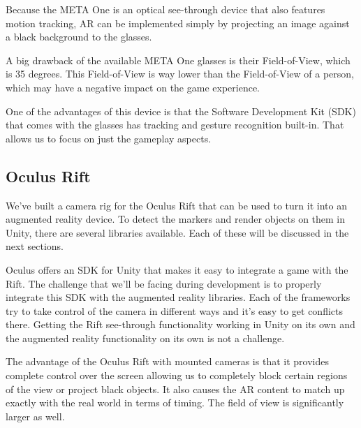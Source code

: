 			Because the META One is an optical see-through device that also
			features motion tracking, AR can be implemented simply by
			projecting an image against a black background to the glasses.

			A big drawback of the available META One glasses is their
			Field-of-View, which is 35 degrees. This Field-of-View is way lower
			than the Field-of-View of a person, which may have a negative impact
			on the game experience.

			One of the advantages of this device is that the Software
			Development Kit (SDK) that comes with the glasses has tracking and
			gesture recognition built-in. That allows us to focus on just the
			gameplay aspects.

		\subsection{Oculus Rift} \label{ssec:oculusrift}
			We've built a camera rig for the Oculus Rift that can be used to
			turn it into an augmented reality device. To detect the markers and
			render objects on them in Unity, there are several libraries
			available. Each of these will be discussed in the next sections.

			Oculus offers an SDK for Unity that makes it easy to integrate a
			game with the Rift. \cite{riftdev} The challenge that we'll be
			facing during development is to properly integrate this SDK with the
			augmented reality libraries. Each of the frameworks try to take
			control of the camera in different ways and it's easy to get
			conflicts there. Getting the Rift see-through functionality working
			in Unity on its own and the augmented reality functionality on its
			own is not a challenge.

			The advantage of the Oculus Rift with mounted cameras is that it
			provides complete control over the screen allowing us to completely
			block certain regions of the view or project black objects. It also
			causes the AR content to match up exactly with the real world in
			terms of timing. The field of view is significantly larger as well.
			
